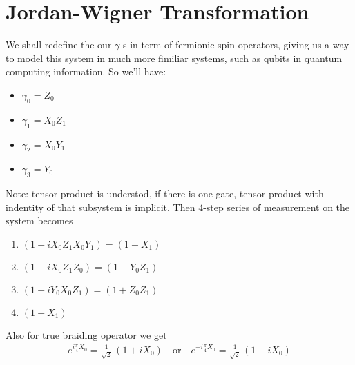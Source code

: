 \documentclass{article}
\begin{document}
\section{Jordan-Wigner Transformation} %
\label{sec:Jordan-Wigner Transformation}
We shall redefine the our $ \gamma $ s in term of fermionic spin operators, giving us a way to model
this system in much more fimiliar systems, such as qubits in quantum computing information. So we'll have:
\begin{itemize}
	\item $ \gamma_0 = Z_0 $
	\item $ \gamma_1 = X_0 Z_1 $
	\item $ \gamma_2 = X_0 Y_1 $
	\item $ \gamma_3 = Y_0 $
\end{itemize}
Note: tensor product is understod, if there is one gate, tensor product with indentity of that subsystem is implicit.
Then 4-step series of measurement on the system becomes
\begin{enumerate}
	\item $ (1 + i X_0 Z_1 X_0 Y_1) = (1 + X_1) $
	\item $ (1 + i X_0 Z_1 Z_0) = (1 + Y_0 Z_1) $
	\item $ (1 + i Y_0 X_0 Z_1) = (1 + Z_0 Z_1) $
	\item $ (1 + X_1) $
\end{enumerate}
Also for true braiding operator we get
\begin{align}
	e^{i \frac{\pi}{4} X_0} = \frac{1}{\sqrt{2}}\, (1 + i X_0 ) \quad \text{or} \quad
	e^{-i \frac{\pi}{4} X_0} = \frac{1}{\sqrt{2}}\, (1 - i X_0 )
	\label{eq:br Jordan-Wigner}
\end{align}
\end{document}
